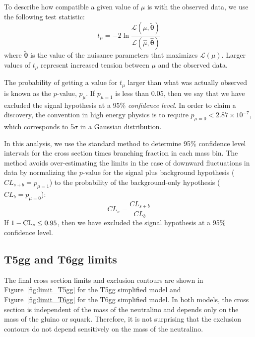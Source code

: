 To describe how compatible a given value of $\mu$ is with the observed data, we use the following test statistic:
\begin{equation}
t_\mu = -2 \ln{ \frac{\mathcal{L}(\mu,\bm{\tilde{\theta}})}{\mathcal{L}(\hat{\mu},\bm{\hat{\theta}})} }
\end{equation}
where $\bm{\tilde{\theta}}$ is the value of the nuisance parameters that maximizes $\mathcal{L}(\mu)$. Larger 
values of $t_\mu$ represent increased tension between $\mu$ and the observed data. 

The probability of getting a value for $t_\mu$ larger than what was actually observed is known as the $p$-value, 
$p_\mu$. If $p_{\mu=1}$ is less than 0.05, then we say that we have excluded the signal hypothesis at a 95\% 
\textit{confidence level}. In order to claim a discovery, the convention in high energy physics is to require
$p_{\mu =0} < 2.87 \times 10^{-7}$, which corresponds to 5$\sigma$ in a Gaussian distribution. 

In this analysis, we use the standard \cls method \cite{Junk:1999kv, Read:2002hq} to 
determine 95\% confidence level intervals for the cross section times branching fraction in each mass bin.
The \cls method avoids over-estimating the limits in the case of downward fluctuations in data by
normalizing the $p$-value for the signal plus background hypothesis ($CL_{s+b} = p_{\mu=1}$) to the
probability of the background-only hypothesis ($CL_{b} = p_{\mu=0}$):
\begin{equation}
CL_s = \frac{CL_{s+b}}{CL_{b}}
\end{equation}
If $1 - \mathrm{CL}_s \leq 0.95$, then we have excluded the signal hypothesis at a 95\% confidence level.

\subsection{T5gg and T6gg limits}
\label{sec:limitResults}

The final cross section limits and exclusion contours are shown in Figure~\ref{fig:limit_T5gg} for the T5gg simplified model
and Figure~\ref{fig:limit_T6gg} for the T6gg simplified model.
In both models, the cross section is independent of the mass of the neutralino and 
depends only on the mass of the gluino or squark. Therefore, it is not surprising that the exclusion contours
do not depend sensitively on the mass of the neutralino. 

